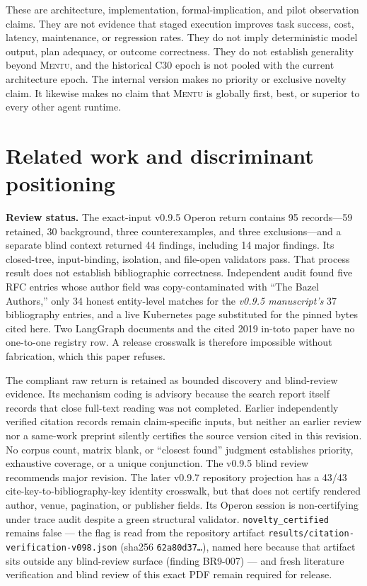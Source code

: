 \documentclass[11pt]{article}
\newcommand{\mentu}{\textsc{Mentu}}
\newcommand{\code}[1]{\texttt{#1}}
\begin{document}
These are architecture, implementation, formal-implication, and pilot
observation claims.  They are not evidence that staged execution improves task
success, cost, latency, maintenance, or regression rates.  They do not imply
deterministic model output, plan adequacy, or outcome correctness. They do not establish
generality beyond \mentu{}, and the historical C30 epoch is not pooled with the
current architecture epoch. The internal version makes no priority or
exclusive novelty claim. It likewise makes no claim that \mentu{} is globally
first, best, or superior to every other agent runtime.

\section{Related work and discriminant positioning}

\textbf{Review status.} The exact-input v0.9.5 Operon return contains 95
records---59 retained, 30 background, three counterexamples, and three
exclusions---and a separate blind context returned 44 findings, including 14
major findings. Its closed-tree, input-binding, isolation, and file-open
validators pass. That process result does not establish bibliographic
correctness. Independent audit found five RFC entries whose author field was
copy-contaminated with ``The Bazel Authors,'' only 34 honest entity-level
matches for the \emph{v0.9.5 manuscript's} 37 bibliography entries, and a live Kubernetes
page substituted for the pinned bytes cited here. Two LangGraph documents and
the cited 2019 in-toto paper have no one-to-one registry row. A release
crosswalk is therefore impossible without fabrication, which this paper
refuses.

The compliant raw return is retained as bounded discovery and blind-review
evidence. Its mechanism coding is advisory because the search report itself
records that close full-text reading was not completed. Earlier independently
verified citation records remain claim-specific inputs, but neither an earlier
review nor a same-work preprint silently certifies the source version cited in
this revision. No corpus count, matrix blank, or ``closest found'' judgment
establishes priority, exhaustive coverage, or a unique conjunction. The
v0.9.5 blind review recommends major revision. The later v0.9.7 repository
projection has a 43/43 cite-key-to-bibliography-key identity crosswalk, but that
does not certify rendered author, venue, pagination, or publisher fields. Its
Operon session is non-certifying under trace audit despite a green structural
validator. \code{novelty\_certified} remains false — the flag is read from
the repository artifact \code{results/citation-verification-v098.json}
(sha256 \code{62a80d37\ldots}), named here because that artifact sits outside
any blind-review surface (finding BR9-007) — and fresh literature
verification and blind review of this exact PDF remain required for release.
\end{document}
